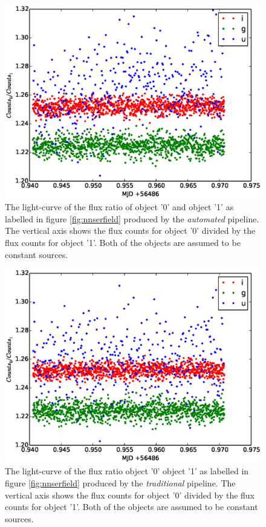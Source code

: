 \begin{figure}[!h]
\centering
\includegraphics[width=140mm]{images/differential_auto.eps}
\caption{The light-curve of the flux ratio of object '0' and object '1' as labelled in figure \ref{fig:nnserfield} produced by the \emph{automated} pipeline. The vertical axis shows the flux counts for object '0' divided by the flux counts for object '1'. Both of the objects are assumed to be constant sources. }
\label{fig:differentialauto}
\end{figure}

\begin{figure}[!h]
\centering
\includegraphics[width=140mm]{images/differential_trad.eps}
\caption{The light-curve of the flux ratio object '0'  object '1' as labelled in figure \ref{fig:nnserfield} produced by the \emph{traditional} pipeline. The vertical axis shows the flux counts for object '0' divided by the flux counts for object '1'. Both of the objects are assumed to be constant sources. }
\label{fig:differentialtrad}
\end{figure}

